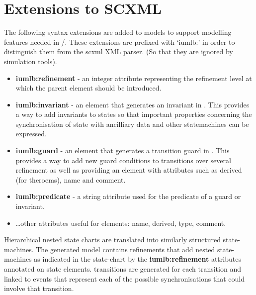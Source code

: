 
\section{Extensions to SCXML}
\label{sec:extensions}
 
The following syntax extensions are added to \SCXML models to support modelling features needed in \iUMLB/\EventB. These extensions are prefixed with `iumlb:' in order to distinguish them from the scxml XML parser. (So that they are ignored by \SCXML simulation tools). 
\begin{itemize}
	\item \textbf{iumlb:refinement} - an integer attribute representing the refinement level at which the parent element should be introduced.
	\item \textbf{iumlb:invariant} - an element that generates an invariant in \iUMLB. This provides a way to add invariants to states so that important properties concerning the synchronisation of state with ancilliary data and other statemachines can be expressed.
	\item \textbf{iumlb:guard} - an element that generates a transition guard in \iUMLB. 
	This provides a way to add new guard conditions to transitions over several refinement as well as providing an element with attributes such as derived (for \EventB theroems), name and comment.
	\item \textbf{iumlb:predicate} - a string attribute used for the predicate of a guard or invariant.
	\item \ldots other attributes useful for \iUMLB elements: name, derived, type, comment.
\end{itemize}

Hierarchical nested state charts are translated into similarly structured \iUMLB state-machines. The generated \iUMLB model contains refinements that add nested state-machines as indicated in the  \SCXML state-chart by the \textbf{iumlb:refinement} attributes annotated on state elements. \iUMLB transitions are generated for each \SCXML transition and linked to \EventB events that represent each of the possible synchronisations that could involve that transition.



